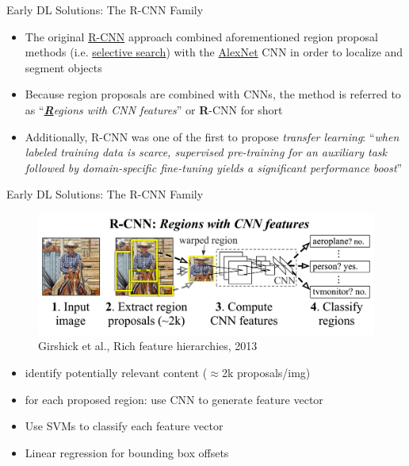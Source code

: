\documentclass[handout]{beamer}
\begin{document}
\begin{frame}{Early DL Solutions: The R-CNN Family}
\begin{itemize}
\itemsep 1em
	\item<1->The original \href{https://arxiv.org/abs/1311.2524}{\color{blue}R-CNN} approach combined aforementioned region proposal methods (i.e. \href{https://ivi.fnwi.uva.nl/isis/publications/bibtexbrowser.php?key=UijlingsIJCV2013\&bib=all.bib}{\color{blue}selective search}) with the \href{https://papers.nips.cc/paper/4824-imagenet-classification-with-deep-convolutional-neural-networks}{\color{blue}AlexNet} CNN in order to localize and segment objects 
	\item<2->Because region proposals are combined with CNNs, the method is referred to as 
	\enquote{\emph{\underline{\textbf{R}}egions with CNN features}} or \textbf{R}-CNN for short
	\item<3->Additionally, R-CNN was one of the first to propose \emph{transfer learning}: \enquote{\emph{when labeled training data is scarce, supervised pre-training for an auxiliary task followed by domain-specific fine-tuning yields a significant performance boost}}
\end{itemize}
\end{frame}

\begin{frame}{Early DL Solutions: The R-CNN Family}
\begin{figure}
        \centering
	\includegraphics[width=\textwidth]{../media/r-cnn-approach.png}
	\caption{Girshick et al., Rich feature hierarchies, 2013}
\end{figure}
  \begin{itemize}
  	\item<1->identify potentially relevant content ($\approx$2k proposals/img)
	\item<2->for each proposed region: use CNN to generate feature vector
	\item<3->Use SVMs to classify each feature vector
	\item<4->Linear regression for bounding box offsets
  \end{itemize}
\end{frame}
\end{document}
